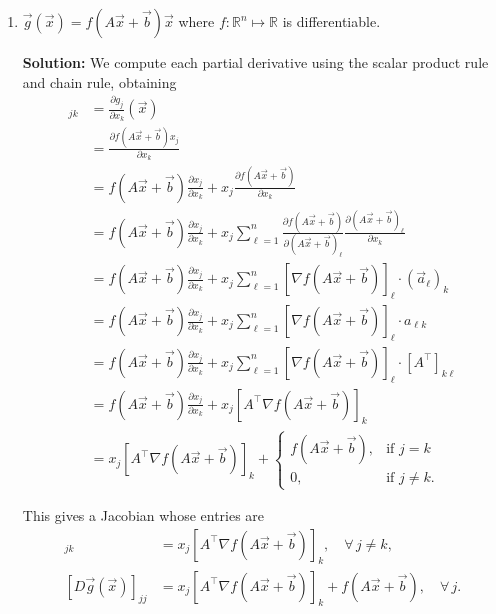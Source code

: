 \documentclass[10pt]{article}
\theoremstyle{definition}
\theoremstyle{plain}
\newcommand{\RR}{\mathbb{R}}
\begin{document}
\begin{enumerate}[label=(\alph*)]
\begin{enumerate}[label=\roman*.]
    For the purpose of self-grades it is fine to stop here. But one can also write the Jacobian as
    \begin{equation}
    D\vec{g}(\vec{x}) = \vec{x}[\nabla f(\vec{x})]^\top + f(\vec{x})I.
    \end{equation}

    \item $\vec{g}(\vec{x}) = f(A\vec{x} + \vec{b})\vec{x}$ where $f : \RR^n \mapsto \RR$ is differentiable.

    \textbf{Solution:} We compute each partial derivative using the scalar product rule and chain rule, obtaining
    \begin{align}
    [D\vec{g}(\vec{x})]_{jk} &= \frac{\partial g_j}{\partial x_k}(\vec{x}) \\
    &= \frac{\partial f(A\vec{x} + \vec{b}) x_j}{\partial x_k} \\
    &= f(A\vec{x} + \vec{b})\frac{\partial x_j}{\partial x_k} + x_j \frac{\partial f(A\vec{x} + \vec{b})}{\partial x_k} \\
    &= f(A\vec{x} + \vec{b})\frac{\partial x_j}{\partial x_k} + x_j \sum_{\ell=1}^{n} \frac{\partial f(A\vec{x} + \vec{b})}{\partial (A\vec{x} + \vec{b})_\ell} \frac{\partial (A\vec{x} + \vec{b})_\ell}{\partial x_k} \\
    &= f(A\vec{x} + \vec{b})\frac{\partial x_j}{\partial x_k} + x_j \sum_{\ell=1}^{n} [\nabla f(A\vec{x} + \vec{b})]_\ell \cdot (\vec{a}_\ell)_k \\
    &= f(A\vec{x} + \vec{b})\frac{\partial x_j}{\partial x_k} + x_j \sum_{\ell=1}^{n} [\nabla f(A\vec{x} + \vec{b})]_\ell \cdot a_{\ell k} \\
    &= f(A\vec{x} + \vec{b})\frac{\partial x_j}{\partial x_k} + x_j \sum_{\ell=1}^{n} [\nabla f(A\vec{x} + \vec{b})]_\ell \cdot [A^\top]_{k\ell} \\
    &= f(A\vec{x} + \vec{b})\frac{\partial x_j}{\partial x_k} + x_j [A^\top \nabla f(A\vec{x} + \vec{b})]_k \\
    &= x_j [A^\top \nabla f(A\vec{x} + \vec{b})]_k + \begin{cases} f(A\vec{x} + \vec{b}), & \text{if } j = k \\ 0, & \text{if } j \neq k. \end{cases}
    \end{align}

    This gives a Jacobian whose entries are
    \begin{align}
    [D\vec{g}(\vec{x})]_{jk} &= x_j [A^\top \nabla f(A\vec{x} + \vec{b})]_k, \quad \forall\, j \neq k, \\
    [D\vec{g}(\vec{x})]_{jj} &= x_j [A^\top \nabla f(A\vec{x} + \vec{b})]_k + f(A\vec{x} + \vec{b}), \quad \forall\, j.
    \end{align}


\end{enumerate}
\end{enumerate}
\end{document}
